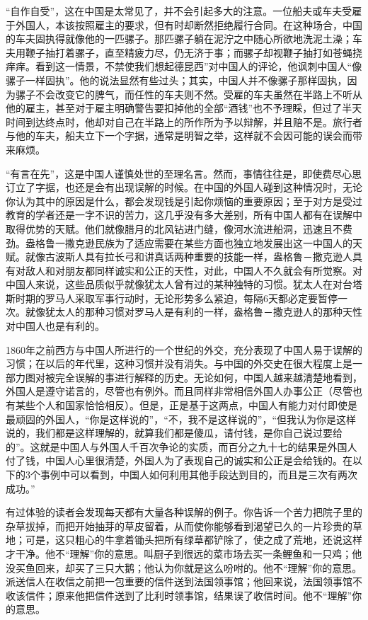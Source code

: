 \documentclass[12pt,oneside]{book}
\begin{document}
\begin{common-format}
“自作自受”，这在中国是太常见了，并不会引起多大的注意。一位船夫或车夫受雇于外国人，本该按照雇主的要求，但有时却断然拒绝履行合同。在这种场合，中国的车夫固执得就像他的一匹骡子。那匹骡子躺在泥泞之中随心所欲地洗泥土澡；车夫用鞭子抽打着骡子，直至精疲力尽，仍无济于事；而骡子却视鞭子抽打如苍蝇挠痒痒。看到这一情景，不禁使我们想起德昆西”对中国人的评论，他讽刺中国人“像骡子一样固执”。他的说法显然有些过头；其实，中国人并不像骡子那样固执，因为骡子不会改变它的脾气，而任性的车夫则不然。受雇的车夫虽然在半路上不听从他的雇主，甚至对于雇主明确警告要扣掉他的全部“酒钱”也不予理睬，但过了半天时间到达终点时，他却对自己在半路上的所作所为予以辩解，并且赔不是。旅行者与他的车夫，船夫立下一个字据，通常是明智之举，这样就不会因可能的误会而带来麻烦。 

“有言在先”，这是中国人谨慎处世的至理名言。然而，事情往往是，即使费尽心思订立了字据，也还是会有出现误解的时候。在中国的外国人碰到这种情况时，无论你认为其中的原因是什么，都会发现钱是引起你烦恼的重要原因；至于对方是受过教育的学者还是一字不识的苦力，这几乎没有多大差别，所有中国人都有在误解中取得优势的天赋。他们就像腊月的北风钻进门缝，像河水流进船洞，迅速且不费劲。盎格鲁一撒克逊民族为了适应需要在某些方面也独立地发展出这一中国人的天赋。就像古波斯人具有拉长弓和讲真话两种重要的技能一样，盎格鲁－撒克逊人具有对敌人和对朋友都同样诚实和公正的天性，对此，中国人不久就会有所觉察。对中国人来说，这些品质似乎就像犹太人曾有过的某种独特的习惯。犹太人在对台塔斯时期的罗马人采取军事行动时，无论形势多么紧迫，每隔6天都必定要暂停一次。就像犹太人的那种习惯对罗马人是有利的一样，盎格鲁－撒克逊人的那种天性对中国人也是有利的。 

1860年之前西方与中国人所进行的一个世纪的外交，充分表现了中国人易于误解的习惯；在以后的年代里，这种习惯并没有消失。与中国的外交史在很大程度上是一部力图对被完全误解的事进行解释的历史。无论如何，中国人越来越清楚地看到，外国人是遵守诺言的，尽管也有例外。而且同样非常相信外国人办事公正（尽管也有某些个人和国家恰恰相反）。但是，正是基于这两点，中国人有能力对付即使是最顽固的外国人，“你是这样说的”，“不，我不是这样说的”，“但我认为你是这样说的，我们都是这样理解的，就算我们都是傻瓜，请付钱，是你自己说过要给的”。这就是中国人与外国人千百次争论的实质，而百分之九十七的结果是外国人付了钱，中国人心里很清楚，外国人为了表现自己的诚实和公正是会给钱的。在以下的3个事例中可以看到，中国人如何利用其他手段达到目的，而且是三次有两次成功。” 

有过体验的读者会发现每天都有大量各种误解的例子。你告诉一个苦力把院子里的杂草拔掉，而把开始抽芽的草皮留着，从而使你能够看到渴望已久的一片珍贵的草地；可是，这只粗心的牛拿着锄头把所有绿草都铲除了，使之成了荒地，还说这样才干净。他不“理解”你的意思。叫厨子到很远的菜市场去买一条鲤鱼和一只鸡；他没买鱼回来，却买了三只大鹅；他认为你就是这么吩咐的。他不“理解”你的意思。派送信人在收信之前把一包重要的信件送到法国领事馆；他回来说，法国领事馆不收该信件；原来他把信件送到了比利时领事馆，结果误了收信时间。他不“理解”你的意思。 


\end{common-format}
\end{document}
